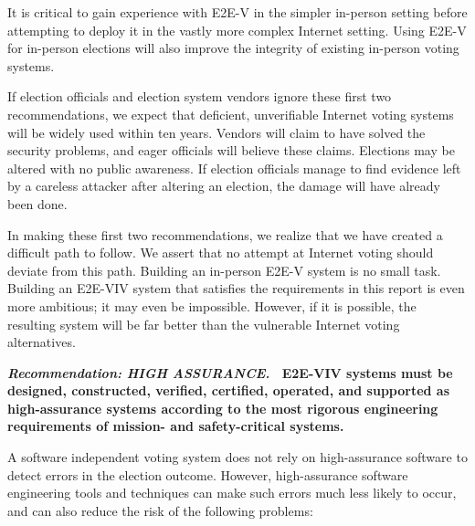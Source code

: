 It is critical to gain experience with E2E-V in the simpler in-person
setting before attempting to deploy it in the vastly more complex
Internet setting. Using E2E-V for in-person elections will also
improve the integrity of existing in-person voting systems.
 
If election officials and election system vendors ignore these first
two recommendations, we expect that deficient, unverifiable Internet
voting systems will be widely used within ten years.  Vendors will
claim to have solved the security problems, and eager officials will
believe these claims.  Elections may be altered with no public
awareness.  If election officials manage to find evidence left by a
careless attacker after altering an election, the damage will have
already been done.
 
In making these first two recommendations, we realize that we have
created a difficult path to follow. We assert that no attempt at
Internet voting should deviate from this path.  Building an in-person
E2E-V system is no small task. Building an E2E-VIV system that
satisfies the requirements in this report is even more ambitious; it
may even be impossible. However, if it is possible, the resulting
system will be far better than the vulnerable Internet voting
alternatives.

\vspace{12pt} 

\textbf{\emph{Recommendation: HIGH ASSURANCE.} \ E2E-VIV systems must
  be designed, constructed, verified, certified, operated, and
  supported as high-assurance systems according to the most rigorous
  engineering requirements of mission- and safety-critical systems.}

A software independent voting system does not rely on high-assurance
software to detect errors in the election outcome. However,
high-assurance software engineering tools and techniques can make such
errors much less likely to occur, and can also reduce the risk of the
following problems:

